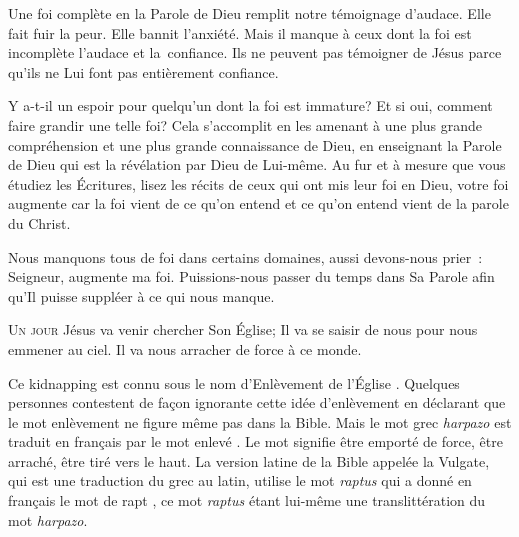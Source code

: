 
Une foi complète en la Parole de Dieu remplit notre témoignage d'audace.
 Elle fait fuir la peur. Elle bannit l'anxiété. Mais il manque à ceux
 dont la foi est incomplète l'audace et la~confiance.
 Ils ne peuvent pas témoigner de Jésus parce qu'ils ne Lui font pas
 entièrement confiance.

Y a-t-il  un espoir pour quelqu'un dont la foi est immature?
 Et si oui, comment faire grandir une telle foi? Cela s'accomplit
 en les amenant à une plus grande compréhension et une plus grande
 connaissance de Dieu, en enseignant la Parole de Dieu qui est la révélation
 par Dieu de Lui-même. Au fur et à mesure que vous étudiez les Écritures,
 lisez les récits de ceux qui ont mis leur foi en Dieu, votre foi augmente
 \ocadr car la foi vient de ce qu'on entend et ce qu'on entend vient
 de la parole du Christ.

Nous manquons tous de foi dans certains domaines, aussi devons-nous prier~: 
 \og Seigneur, augmente ma foi. \fg{}
 Puissions-nous passer du temps dans Sa Parole afin qu'Il puisse
 suppléer à ce qui nous manque.

\dvrule






\lettrine{U}{n jour} Jésus va venir chercher Son Église;
 Il va se saisir de nous pour nous emmener au ciel.
 Il va nous arracher de force à ce monde.

Ce \og kidnapping \fg{} est connu sous le nom \og d'Enlèvement de l'Église \fg{}.
 Quelques personnes contestent de façon ignorante cette idée d'enlèvement
 en déclarant que le mot \og enlèvement \fg{} ne figure même pas dans la Bible.
 Mais le mot grec \emph{harpazo} est traduit en français
 par le mot \og enlevé \fg{}. Le mot signifie \og être emporté de force,
 être arraché, être tiré vers le haut. \fg{}
 La version latine de la Bible appelée la Vulgate, qui est une traduction
 du grec au latin,  utilise
 le mot \emph{raptus} qui a donné en français le mot de \og rapt \fg{},
 ce mot \emph{raptus} étant lui-même une translittération du mot \emph{harpazo}. 


